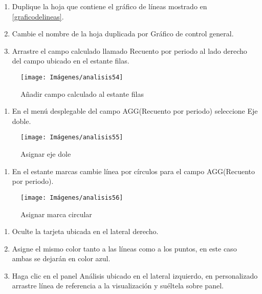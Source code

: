 \documentclass[
]{book}
\providecommand{\tightlist}{%
  \setlength{\itemsep}{0pt}\setlength{\parskip}{0pt}}
\begin{document}
\begin{enumerate}
\def\labelenumi{\arabic{enumi}.}
\item
  Duplique la hoja que contiene el gráfico de líneas mostrado en \ref{graficodelineas}.
\item
  Cambie el nombre de la hoja duplicada por Gráfico de control general.
\item
  Arrastre el campo calculado llamado Recuento por periodo al lado derecho del campo ubicado en el estante filas.
\end{enumerate}

\begin{figure}

{\centering \texttt{[image: Imágenes/analisis54]} 

}

\caption{Añadir campo calculado al estante filas}\label{fig:paso3graficodecontrol-fig}
\end{figure}

\begin{enumerate}
\def\labelenumi{\arabic{enumi}.}
\setcounter{enumi}{3}
\tightlist
\item
  En el menú desplegable del campo AGG(Recuento por periodo) seleccione Eje doble.
\end{enumerate}

\begin{figure}

{\centering \texttt{[image: Imágenes/analisis55]} 

}

\caption{Asignar eje dole}\label{fig:paso4graficodecontrol-fig}
\end{figure}

\begin{enumerate}
\def\labelenumi{\arabic{enumi}.}
\setcounter{enumi}{4}
\tightlist
\item
  En el estante marcas cambie línea por círculos para el campo AGG(Recuento por periodo).
\end{enumerate}

\begin{figure}

{\centering \texttt{[image: Imágenes/analisis56]} 

}

\caption{Asignar marca circular}\label{fig:paso5graficodecontrol-fig}
\end{figure}

\begin{enumerate}
\def\labelenumi{\arabic{enumi}.}
\setcounter{enumi}{5}
\item
  Oculte la tarjeta ubicada en el lateral derecho.
\item
  Asigne el mismo color tanto a las líneas como a los puntos, en este caso ambas se dejarán en color azul.
\item
  Haga clic en el panel Análisis ubicado en el lateral izquierdo, en personalizado arrastre línea de referencia a la visualización y suéltela sobre panel.
\end{enumerate}
\end{document}
